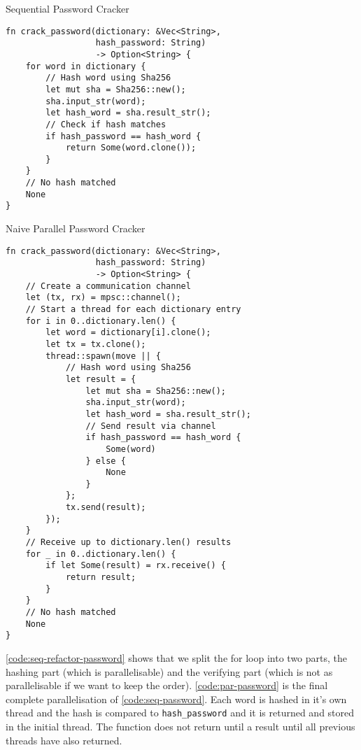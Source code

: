 \documentclass[conference]{IEEEtran}
\begin{document}
\begin{algorithm}
\caption{Sequential Password Cracker}
\label{code:seq-password}
\begin{verbatim}
fn crack_password(dictionary: &Vec<String>,
                  hash_password: String)
                  -> Option<String> {
    for word in dictionary {
        // Hash word using Sha256
        let mut sha = Sha256::new();
        sha.input_str(word);
        let hash_word = sha.result_str();
        // Check if hash matches
        if hash_password == hash_word {
            return Some(word.clone());
        }
    }
    // No hash matched
    None
}
\end{verbatim}
\end{algorithm}

\begin{algorithm}
\caption{Naive Parallel Password Cracker}
\label{code:par-naive-password}
\begin{verbatim}
fn crack_password(dictionary: &Vec<String>,
                  hash_password: String)
                  -> Option<String> {
    // Create a communication channel
    let (tx, rx) = mpsc::channel();
    // Start a thread for each dictionary entry
    for i in 0..dictionary.len() {
        let word = dictionary[i].clone();
        let tx = tx.clone();
        thread::spawn(move || {
            // Hash word using Sha256
            let result = {
                let mut sha = Sha256::new();
                sha.input_str(word);
                let hash_word = sha.result_str();
                // Send result via channel
                if hash_password == hash_word {
                    Some(word)
                } else {
                    None
                }
            };
            tx.send(result);
        });
    }
    // Receive up to dictionary.len() results
    for _ in 0..dictionary.len() {
        if let Some(result) = rx.receive() {
            return result;
        }
    }
    // No hash matched
    None
}
\end{verbatim}
\end{algorithm}

\autoref{code:seq-refactor-password} shows that we split the for loop into two parts, the hashing part (which is parallelisable) and the verifying part (which is not as parallelisable if we want to keep the order). \autoref{code:par-password} is the final complete parallelisation of \autoref{code:seq-password}. Each word is hashed in it's own thread and the hash is compared to \texttt{hash\_password} and it is returned and stored in the initial thread. The function does not return until a result until all previous threads have also returned.
\end{document}
